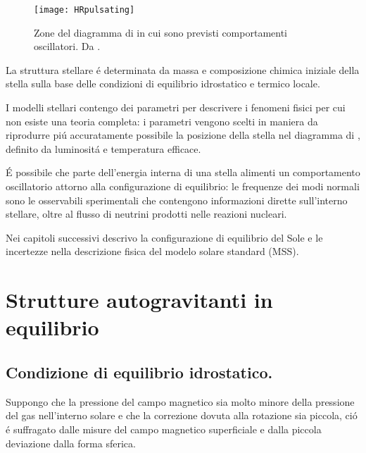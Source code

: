 \documentclass[../main.tex]{subfiles}
\begin{document}
\begin{wrapfigure}[23]{r}{0.6\textwidth}
\texttt{[image: HRpulsating]} \label{fig:HRp}
\caption{Zone del diagramma di \hr{} in cui sono previsti comportamenti oscillatori. Da \cite{chr97lecture}.}
\end{wrapfigure}

\vfill

La struttura stellare \'e determinata da massa e composizione chimica iniziale della stella sulla base delle condizioni di equilibrio idrostatico e termico locale.

I modelli stellari contengo dei parametri per descrivere i fenomeni fisici per cui non esiste una teoria completa: i parametri vengono scelti in maniera da riprodurre pi\'u accuratamente possibile la posizione della stella nel diagramma di \hr{}, definito da luminosit\'a e temperatura efficace.


\'E possibile che parte dell'energia interna di una stella alimenti un comportamento oscillatorio attorno alla configurazione di equilibrio: le frequenze dei modi normali sono le osservabili sperimentali che contengono informazioni dirette sull'interno stellare, oltre al flusso di neutrini prodotti nelle reazioni nucleari.

 Nei capitoli successivi descrivo la configurazione di equilibrio del Sole e le incertezze nella descrizione fisica del modelo solare standard (MSS).


{\let\clearpage\relax\let\cleardoublepage\relax
\chapter{Strutture autogravitanti in equilibrio}
}

\section{Condizione di equilibrio idrostatico.}

Suppongo che la pressione del campo magnetico sia molto minore della pressione del gas nell'interno solare e che la correzione dovuta alla rotazione sia piccola, ci\'o \'e suffragato dalle misure del campo magnetico superficiale e dalla piccola deviazione dalla forma sferica.
\end{document}
